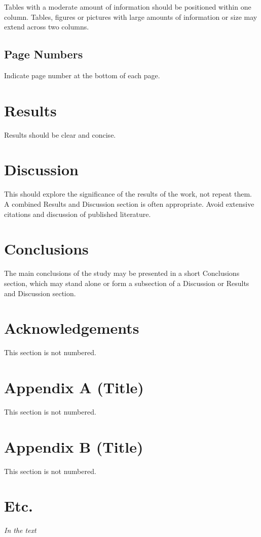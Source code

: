 \documentclass[twocolumn, 10pt]{article}
\begin{document}
Tables with a moderate amount of information should be positioned within one column. Tables, figures or pictures with large amounts of information or size may extend across two columns.

\subsection{Page Numbers}
Indicate page number at the bottom of each page.

\section{Results}
Results should be clear and concise.

\section{Discussion}
This should explore the significance of the results of the work, not repeat them. A combined Results and Discussion section is often appropriate. Avoid extensive citations and discussion of published literature.

\section{Conclusions}
The main conclusions of the study may be presented in a short Conclusions section, which may stand alone or form a subsection of a Discussion or Results and Discussion section.

\section*{Acknowledgements}
This section is not numbered.

\section*{Appendix A (Title)}
This section is not numbered.

\section*{Appendix B (Title)}
This section is not numbered.

\section*{Etc.}

\noindent\textit{In the text}
\end{document}
